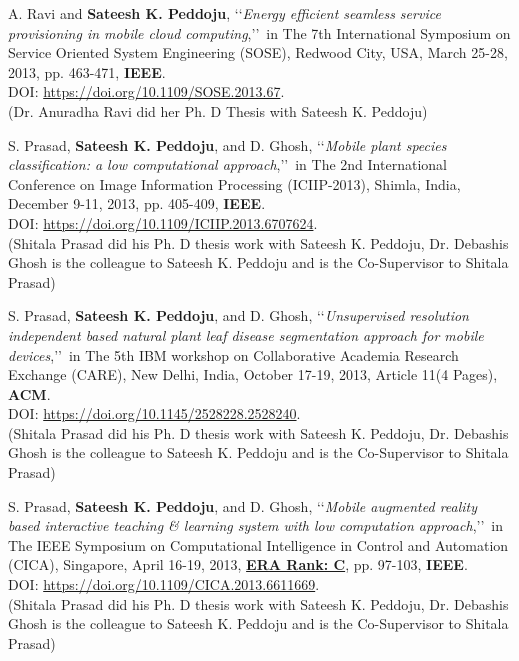 \begin{etaremune}
	
	\item
	A. Ravi and \textbf{Sateesh K. Peddoju}, \lq\lq \textit{Energy efficient seamless service provisioning in mobile cloud computing},\rq\rq\, in The 7th International Symposium on Service Oriented System Engineering (SOSE), Redwood City, USA, March 25-28, 2013, pp. 463-471, \textbf{IEEE}. \\DOI: \url{https://doi.org/10.1109/SOSE.2013.67}. \\(Dr. Anuradha Ravi did her Ph. D Thesis with Sateesh K. Peddoju)
	
	\item
	S. Prasad, \textbf{Sateesh K. Peddoju}, and D. Ghosh, \lq\lq \textit{Mobile plant species classification: a low computational approach},\rq\rq\, in The 2nd International Conference on Image Information Processing (ICIIP-2013), Shimla, India, December 9-11, 2013, pp. 405-409, \textbf{IEEE}. \\DOI: \url{https://doi.org/10.1109/ICIIP.2013.6707624}. \\(Shitala Prasad did his Ph. D thesis work with Sateesh K. Peddoju, Dr. Debashis Ghosh is the colleague to Sateesh K. Peddoju and is the Co-Supervisor to Shitala Prasad)

	
	\item
	S. Prasad, \textbf{Sateesh K. Peddoju}, and D. Ghosh, \lq\lq \textit{Unsupervised resolution independent based natural plant leaf disease segmentation approach for mobile devices},\rq\rq\, in The 5th IBM workshop on Collaborative Academia Research Exchange (CARE), New Delhi, India,  October 17-19, 2013, Article 11(4 Pages), \textbf{ACM}. \\DOI: \url{https://doi.org/10.1145/2528228.2528240}. \\(Shitala Prasad did his Ph. D thesis work with Sateesh K. Peddoju, Dr. Debashis Ghosh is the colleague to Sateesh K. Peddoju and is the Co-Supervisor to Shitala Prasad)

	
	\item
	S. Prasad, \textbf{Sateesh K. Peddoju}, and D. Ghosh, \lq\lq \textit{Mobile augmented reality based interactive teaching \& learning system with low computation approach},\rq\rq\, in The IEEE Symposium on Computational Intelligence in Control and Automation (CICA), Singapore, April 16-19, 2013, \underline{\textbf{ERA Rank: C}}, pp. 97-103, \textbf{IEEE}. \\DOI: \url{https://doi.org/10.1109/CICA.2013.6611669}.\\(Shitala Prasad did his Ph. D thesis work with Sateesh K. Peddoju, Dr. Debashis Ghosh is the colleague to Sateesh K. Peddoju and is the Co-Supervisor to Shitala Prasad)


\end{etaremune}
